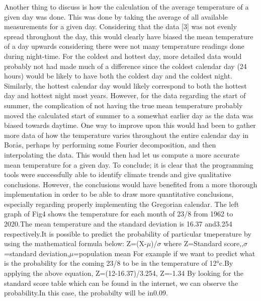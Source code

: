 \documentclass[a4, 12pt]{article}
\begin{document}
\indent Another thing to discuss is how the calculation of the average temperature of a given day was done. This was done by taking the average of all available measurements for a given day. Considering that the data [3] was not evenly spread throughout the day, this would clearly have biased the mean temperature of a day upwards considering there were not many temperature readings done during night-time. For the coldest and hottest day, more detailed data would probably not had made much of a difference since the coldest calendar day (24 hours) would be likely to have both the coldest day and the coldest night. Similarly, the hottest calendar day would likely correspond to both the hottest day and hottest night most years. However, for the data regarding the start of summer, the complication of not having the true mean temperature probably moved the calculated start of summer to a somewhat earlier day as the data was biased towards daytime. One way to improve upon this would had been to gather more data of how the temperature varies throughout the entire calendar day in Borås, perhaps by performing some Fourier decomposition, and then interpolating the data. This would then had let us compute a more accurate mean temperature for a given day. \newline
\indent To conclude; it is clear that the programming tools were successfully able to identify climate trends and give qualitative conclusions. However, the conclusions would have benefited from a more thorough implementation in order to be able to draw more quantitative conclusions, especially regarding properly implementing the Gregorian calendar. \newline
\indent The left graph of Fig4 shows the temperature for each month of 23/8 from 1962 to 2020.The mean temperature and the standard deviation is 16.37 and3.254 respectively.It is possible to predict the probability of particular tmeperature by using the mathematical formula below:\newline\indent
Z=(X-$\mu$)/$\sigma$ where Z=Standard score,,$\sigma$=standard deviation,$\mu$=population mean\newline\indent
For example if we want to predict what is the probability for the coming 23/8 to be in the temperature of 12°c.By applying the above equation,\newline\indent
Z=(12-16.37)/3.254,
Z=-1.34 \newline\indent
By looking for the standard score table which can be found in the internet, we can observe the probability.In this case, the probabilty will be in0.09.\newline\indent
\end{document}
